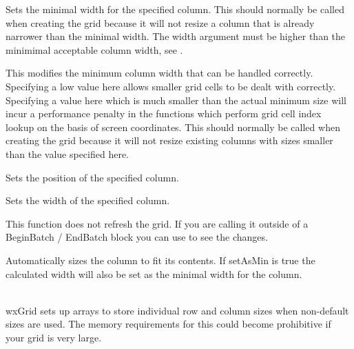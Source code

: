 \label{wxgridsetcolminimalwidth}


Sets the minimal width for the specified column. This should normally be called when creating the grid
because it will not resize a column that is already narrower than the minimal width.
The width argument must be higher than the minimimal acceptable column width, see
.



\label{wxgridsetcolminimalacceptablewidth}


This modifies the minimum column width that can be handled correctly. Specifying a low value here
allows smaller grid cells to be dealt with correctly. Specifying a value here which is much smaller
than the actual minimum size will incur a performance penalty in the functions which perform
grid cell index lookup on the basis of screen coordinates.
This should normally be called when creating the grid because it will not resize existing columns
with sizes smaller than the value specified here.



\label{wxgridsetcolpos}


Sets the position of the specified column.



\label{wxgridsetcolsize}


Sets the width of the specified column.

This function does not refresh the grid. If you are calling it outside of a BeginBatch / EndBatch
block you can use  to see the changes.

Automatically sizes the column to fit its contents. If setAsMin is true the calculated width will
also be set as the minimal width for the column.

\\
wxGrid sets up arrays to store individual row and column sizes when non-default sizes are used.
The memory requirements for this could become prohibitive if your grid is very large.



